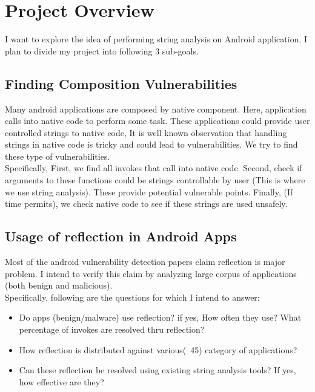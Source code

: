 \documentclass[12pt]{article}
\begin{document}
\maketitle

\section{Project Overview}
I want to explore the idea of performing string analysis on Android application. I plan to divide my project into following 3 sub-goals.
\subsection{Finding Composition Vulnerabilities}
Many android applications are composed by native component. Here, application calls into native code to perform some task. These applications could provide user controlled strings to native code, It is well known observation that handling strings in native code is tricky and could lead to vulnerabilities. We try to find these type of vulnerabilities.\\

Specifically, First, we find all invokes that call into native code. Second, check if arguments to these functions could be strings controllable by user (This is where we use string analysis). These provide potential vulnerable points. Finally, (If time permits), we check native code to see if these strings are used unsafely.
\subsection{Usage of reflection in Android Apps}
Most of the android vulnerability detection papers claim reflection is major problem. I intend to verify this claim by analyzing large corpus of applications (both benign and malicious).\\

Specifically, following are the questions for which I intend to answer:
\begin{itemize}
\item Do apps (benign/malware) use reflection? if yes, How often they use? What percentage of invokes are resolved thru reflection?
\item How reflection is distributed against various(~45) category of applications?
\item Can these reflection be resolved using existing string analysis tools? If yes, how effective are they?
\end{itemize}
\end{document}

